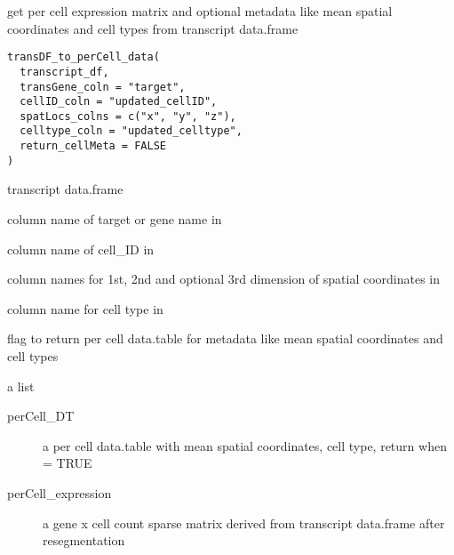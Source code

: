 \documentclass[letterpaper]{book}
\begin{document}
%
\begin{Description}
get per cell expression matrix and optional metadata like mean spatial coordinates and cell types from transcript data.frame
\end{Description}
%
\begin{Usage}
\begin{verbatim}
transDF_to_perCell_data(
  transcript_df,
  transGene_coln = "target",
  cellID_coln = "updated_cellID",
  spatLocs_colns = c("x", "y", "z"),
  celltype_coln = "updated_celltype",
  return_cellMeta = FALSE
)
\end{verbatim}
\end{Usage}
%
\begin{Arguments}
\begin{ldescription}
\item[\code{transcript\_df}] transcript data.frame

\item[\code{transGene\_coln}] column name of target or gene name in 

\item[\code{cellID\_coln}] column name of cell\_ID in 

\item[\code{spatLocs\_colns}] column names for 1st, 2nd and optional 3rd dimension of spatial coordinates in 

\item[\code{celltype\_coln}] column name for cell type in 

\item[\code{return\_cellMeta}] flag to return per cell data.table for metadata like mean spatial coordinates and cell types
\end{ldescription}
\end{Arguments}
%
\begin{Value}
a list
\begin{description}

\item[perCell\_DT] a per cell data.table with mean spatial coordinates, cell type, return when  = TRUE
\item[perCell\_expression] a gene x cell count sparse matrix derived from transcript data.frame after resegmentation

\end{description}

\end{Value}
\end{document}
